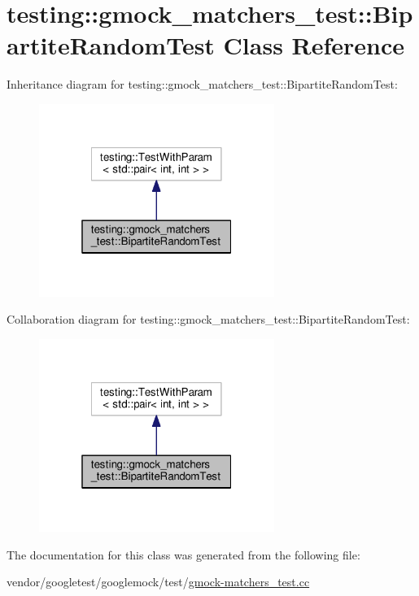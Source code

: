\hypertarget{classtesting_1_1gmock__matchers__test_1_1BipartiteRandomTest}{}\section{testing\+:\+:gmock\+\_\+matchers\+\_\+test\+:\+:Bipartite\+Random\+Test Class Reference}
\label{classtesting_1_1gmock__matchers__test_1_1BipartiteRandomTest}


Inheritance diagram for testing\+:\+:gmock\+\_\+matchers\+\_\+test\+:\+:Bipartite\+Random\+Test\+:\nopagebreak
\begin{figure}[H]
\begin{center}
\leavevmode
\includegraphics[width=217pt]{classtesting_1_1gmock__matchers__test_1_1BipartiteRandomTest__inherit__graph}
\end{center}
\end{figure}


Collaboration diagram for testing\+:\+:gmock\+\_\+matchers\+\_\+test\+:\+:Bipartite\+Random\+Test\+:\nopagebreak
\begin{figure}[H]
\begin{center}
\leavevmode
\includegraphics[width=217pt]{classtesting_1_1gmock__matchers__test_1_1BipartiteRandomTest__coll__graph}
\end{center}
\end{figure}


The documentation for this class was generated from the following file\+:\begin{DoxyCompactItemize}
\item 
vendor/googletest/googlemock/test/\hyperlink{gmock-matchers__test_8cc}{gmock-\/matchers\+\_\+test.\+cc}\end{DoxyCompactItemize}
